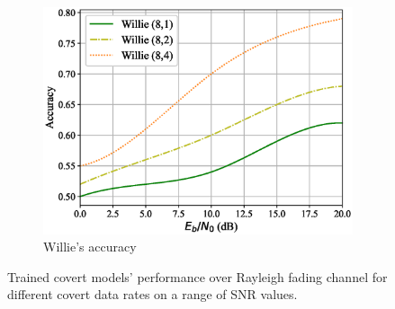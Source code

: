 \begin{figure}
\begin{subfigure}{0.3\textwidth}
		\includegraphics[width=\linewidth]{figs/willie_accuracy_rayleigh}
		\caption{Willie's accuracy}
		\label{fig:rayleigh_resutls_willie}
	\end{subfigure}
	\caption{Trained covert models' performance over Rayleigh fading channel for different covert data rates on a range of SNR values.}
	\label{fig:rayleigh_resutls}
\end{figure}
